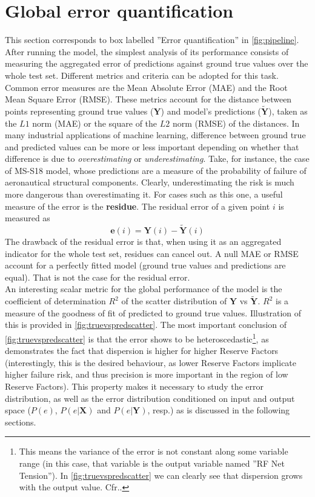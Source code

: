 \section{Global error quantification}
\noindent This section corresponds to box labelled ''Error quantification'' in \autoref{fig:pipeline}.\\
%
\indent After running the model, the simplest analysis of its performance consists of measuring the aggregated error of predictions against ground true values over the whole test set. Different metrics and criteria can be adopted for this task. Common error measures are the Mean Absolute Error (MAE) and the Root Mean Square Error (RMSE). These metrics account for the distance between points representing ground true values ($\mathbf{Y}$) and model's predictions ($\mathbf{\tilde{Y}}$), taken as the $L1$ norm (MAE) or the square of the $L2$ norm (RMSE) of the distances. In many industrial applications of machine learning, difference between ground true and predicted values can be more or less important depending on whether that difference is due to \textit{overestimating} or \textit{underestimating}. Take, for instance, the case of MS-S18 model, whose predictions are a measure of the probability of failure of aeronautical structural components. Clearly, underestimating the risk is much more dangerous than overestimating it. For cases such as this one, a useful measure of the error is the \textbf{residue}. The residual error of a given point $i$ is measured as
\begin{equation}\label{eq:residue}
	\mathbf{e}(i)=\mathbf{Y}(i)-\mathbf{\tilde{Y}}(i)
\end{equation}
The drawback of the residual error is that, when using it as an aggregated indicator for the whole test set, residues can cancel out. A null MAE or RMSE account for a perfectly fitted model (ground true values and predictions are equal). That is not the case for the residual error.\\
%
\indent An interesting scalar metric for the global performance of the model is the coefficient of determination $R^2$ \cite{zhang2017coefficient} of the scatter distribution of $\mathbf{Y}$ vs $\mathbf{\tilde{Y}}$. $R^2$ is a measure of the goodness of fit of predicted to ground true values. Illustration of this is provided in \autoref{fig:truevspredscatter}. The most important conclusion of \autoref{fig:truevspredscatter} is that the error shows to be heteroscedastic{\protect\footnote{This means the variance of the error is not constant along some variable range (in this case, that variable is the output variable named ''RF Net Tension''). In \autoref{fig:truevspredscatter} we can clearly see that dispersion grows with the output value. Cfr.\cite[p. 374]{jobson2012applied}.}}, as demonstrates the fact that dispersion is higher for higher Reserve Factors (interestingly, this is the desired behaviour, as lower Reserve Factors implicate higher failure risk, and thus precision is more important in the region of low Reserve Factors). This property makes it necessary to study the error distribution, as well as the error distribution conditioned on input and output space ($P(e)$, $P(e|\mathbf{X})$ and $P(e|\mathbf{Y})$, resp.) as is discussed in the following sections.\\
